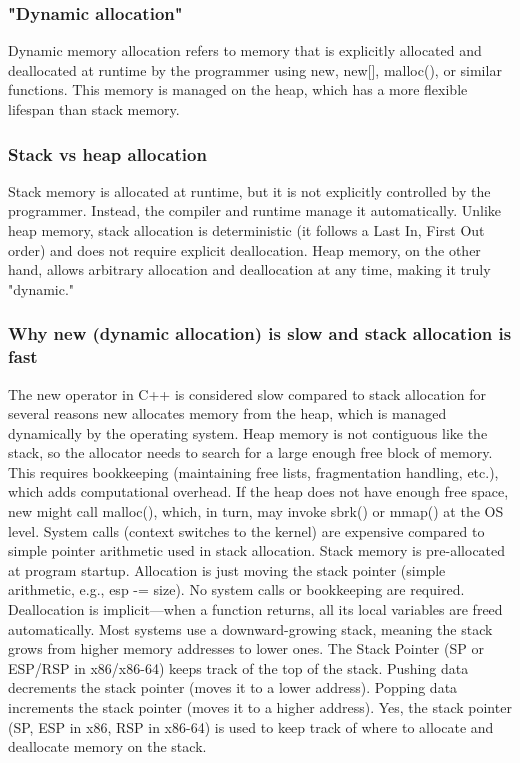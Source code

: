 \documentclass{report}
\begin{document}
 \bigbreak \noindent 
 \subsubsection{"Dynamic allocation"}
 \bigbreak \noindent 
 Dynamic memory allocation refers to memory that is explicitly allocated and deallocated at runtime by the programmer using new, new[], malloc(), or similar functions. This memory is managed on the heap, which has a more flexible lifespan than stack memory.

 \bigbreak \noindent 
 \subsubsection{Stack vs heap allocation}
 \bigbreak \noindent 
 Stack memory is allocated at runtime, but it is not explicitly controlled by the programmer. Instead, the compiler and runtime manage it automatically.
 \bigbreak \noindent 
 Unlike heap memory, stack allocation is deterministic (it follows a Last In, First Out order) and does not require explicit deallocation.
 \bigbreak \noindent 
 Heap memory, on the other hand, allows arbitrary allocation and deallocation at any time, making it truly "dynamic."

 \bigbreak \noindent 
 \subsubsection{Why new (dynamic allocation) is slow and stack allocation is fast}
 \bigbreak \noindent 
 The new operator in C++ is considered slow compared to stack allocation for several reasons
 \bigbreak \noindent 
 new allocates memory from the heap, which is managed dynamically by the operating system. Heap memory is not contiguous like the stack, so the allocator needs to search for a large enough free block of memory. This requires bookkeeping (maintaining free lists, fragmentation handling, etc.), which adds computational overhead.
 \bigbreak \noindent 
 If the heap does not have enough free space, new might call malloc(), which, in turn, may invoke sbrk() or mmap() at the OS level.
 \bigbreak \noindent 
    System calls (context switches to the kernel) are expensive compared to simple pointer arithmetic used in stack allocation.
    \bigbreak \noindent 
    Stack memory is pre-allocated at program startup. Allocation is just moving the stack pointer (simple arithmetic, e.g., esp -= size). No system calls or bookkeeping are required.
    \bigbreak \noindent 
    Deallocation is implicit—when a function returns, all its local variables are freed automatically.
    \bigbreak \noindent 
    Most systems use a downward-growing stack, meaning the stack grows from higher memory addresses to lower ones.
    \bigbreak \noindent 
    The Stack Pointer (SP or ESP/RSP in x86/x86-64) keeps track of the top of the stack.
    \bigbreak \noindent 
    Pushing data decrements the stack pointer (moves it to a lower address).
    \bigbreak \noindent 
    Popping data increments the stack pointer (moves it to a higher address).
    \bigbreak \noindent 
    Yes, the stack pointer (SP, ESP in x86, RSP in x86-64) is used to keep track of where to allocate and deallocate memory on the stack.
    \bigbreak \noindent 
\end{document}
